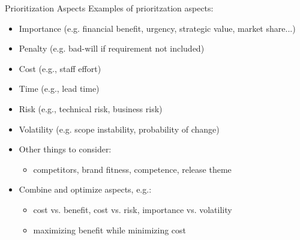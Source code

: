 \begin{Slide}{Prioritization Aspects}
Examples of prioritzation aspects:
\begin{itemize}
\item Importance (e.g. financial benefit, urgency, strategic value, market share...)
\item Penalty (e.g. bad-will if requirement not included)
\item Cost (e.g., staff effort)
\item Time (e.g., lead time)
\item Risk (e.g., technical risk, business risk)
\item Volatility (e.g. scope instability, probability of change)
\item Other things to consider: 
\begin{itemize}
\item competitors, brand fitness, competence, release theme
\end{itemize}
\item Combine and optimize aspects, e.g.:
\begin{itemize}
\item cost vs. benefit, cost vs. risk, importance vs. volatility
\item maximizing benefit while minimizing cost

\end{itemize}
\end{itemize}
\end{Slide}